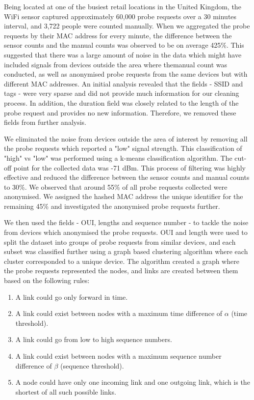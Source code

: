\documentclass[11t, a4paper, twocolumn]{article}
\begin{document}
		Being located at one of the busiest retail locations in the United Kingdom, the WiFi sensor captured approximately 60,000 probe requests over a 30 minutes interval, and 3,722 people were counted manually.
		When we aggregated the probe requests by their MAC address for every minute, the difference between the sensor counts and the manual counts was observed to be on average 425\%.
		This suggested that there was a large amount of noise in the data which might have included signals from devices outside the area where themanual count was conducted, as well as anonymised probe requests from the same devices but with different MAC addresses.
		An initial analysis revealed that the fields - SSID and tags - were very sparse and did not provide much information for our cleaning process.
		In addition, the duration field was closely related to the length of the probe request and provides no new information.
		Therefore, we removed these fields from further analysis.

		We eliminated the noise from devices outside the area of interest by removing all the probe requests which reported a "low" signal strength.
		This classification of "high" vs "low" was performed using a k-means classification algorithm.
		The cut-off point for the collected data was -71 dBm.
		This process of filtering was highly effective and reduced the difference between the sensor counts and manual counts to 30\%.
		We observed that around 55\% of all probe requests collected were anonymised.
		We assigned the hashed MAC address the unique identifier for the remaining 45\% and investigated the anonymised probe requests further.

		We then used the fields - OUI, lengths and sequence number - to tackle the noise from devices which anonymised the probe requests.
		OUI and length were used to split the dataset into groups of probe requests from similar devices, and each subset was classified further using a graph based clustering algorithm where each cluster corresponded to a unique device.
		The algorithm created a graph where the probe requests represented the nodes, and links are created between them based on the following rules: 
		
			\begin{enumerate}
				\item A link could go only forward in time. 
				\item A link could exist between nodes with a maximum time difference of $\alpha$ (time threshold).
				\item A link could go from low to high sequence numbers.
				\item A link could exist between nodes with a maximum sequence number difference of $\beta$ (sequence threshold).
				\item A node could have only one incoming link and one outgoing link, which is the shortest of all such possible links.
			\end{enumerate}
\end{document}
